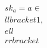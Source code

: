 \documentclass[preview]{standalone}
\begin{document}
\begin{align*}
sk_a = a \in \\llbracket 1, \\ell \\rrbracket
\end{align*}
\end{document}
